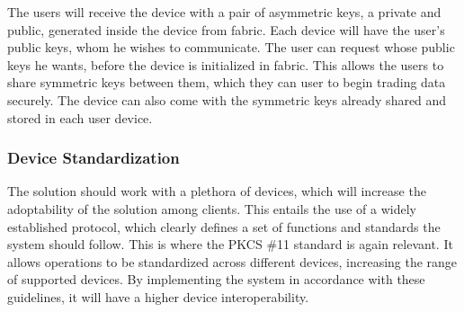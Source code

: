 The users will receive the device with a pair of asymmetric keys, a private and public, generated inside the device from fabric. Each device will have the user's public keys, whom he wishes to communicate. The user can request whose public keys he wants, before the device is initialized in fabric. This allows the users to share symmetric keys between them, which they can user to begin trading data securely. The device can also come with the symmetric keys already shared and stored in each user device.

\subsubsection{Device Standardization}

The solution should work with a plethora of devices, which will increase the adoptability of the solution among clients. This entails the use of a widely established protocol, which clearly defines a set of functions and standards the system should follow.
This is where the \ac{PKCS} \#11 standard is again relevant. It allows operations to be standardized across different devices, increasing the range of supported devices. By implementing the system in accordance with these guidelines, it will have a higher device interoperability.
